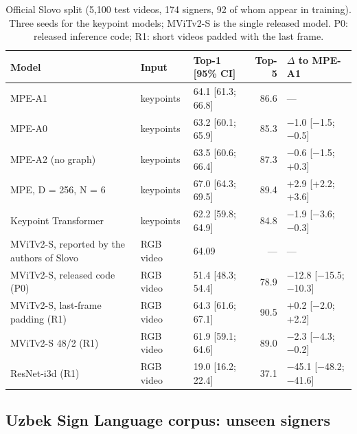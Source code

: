 \begin{table}[t]
\caption{Official Slovo split (5,100 test videos, 174 signers, 92 of whom appear in training). Three seeds for the keypoint models; MViTv2-S is the single released model. P0: released inference code; R1: short videos padded with the last frame.}\label{tab:official}
\footnotesize
\centering
\begin{tabular}{lllrl}
\toprule
\textbf{Model} & \textbf{Input} & \textbf{Top-1 [95\% CI]} & \textbf{Top-5} & \textbf{$\Delta$ to MPE-A1} \\
\midrule
MPE-A1 & keypoints & 64.1 [61.3; 66.8] & 86.6 & --- \\
MPE-A0 & keypoints & 63.2 [60.1; 65.9] & 85.3 & −1.0 [−1.5; −0.5] \\
MPE-A2 (no graph) & keypoints & 63.5 [60.6; 66.4] & 87.3 & −0.6 [−1.5; +0.3] \\
MPE, D = 256, N = 6 & keypoints & 67.0 [64.3; 69.5] & 89.4 & +2.9 [+2.2; +3.6] \\
Keypoint Transformer & keypoints & 62.2 [59.8; 64.9] & 84.8 & −1.9 [−3.6; −0.3] \\
MViTv2-S, reported by the authors of Slovo & RGB video & 64.09 & --- & --- \\
MViTv2-S, released code (P0) & RGB video & 51.4 [48.3; 54.4] & 78.9 & −12.8 [−15.5; −10.3] \\
MViTv2-S, last-frame padding (R1) & RGB video & 64.3 [61.6; 67.1] & 90.5 & +0.2 [−2.0; +2.2] \\
MViTv2-S 48/2 (R1) & RGB video & 61.9 [59.1; 64.6] & 89.0 & −2.3 [−4.3; −0.2] \\
ResNet-i3d (R1) & RGB video & 19.0 [16.2; 22.4] & 37.1 & −45.1 [−48.2; −41.6] \\
\bottomrule
\end{tabular}
\end{table}

\hypertarget{uzbek-sign-language-corpus-unseen-signers}{%
\subsection{Uzbek Sign Language corpus: unseen signers}\label{uzbek-sign-language-corpus-unseen-signers}}

